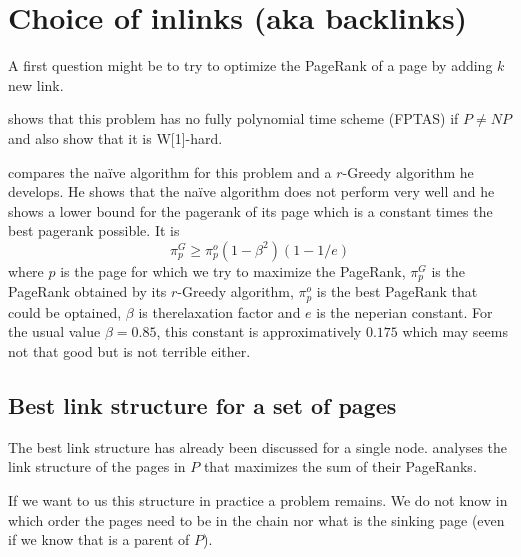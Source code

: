 \documentclass{article}
\newcommand{\1}{\mathbf{1}}
\theoremstyle{definition}
\begin{document}
\section{Choice of inlinks (aka backlinks)}
A first question might be to try to optimize the PageRank of a page
by adding $k$ new link.

\cite{olsen2010maximizing} shows that this problem has no fully polynomial time scheme (FPTAS) if $P \neq NP$ and also show that it is W[1]-hard.

\cite{olsen2010constant} compares the naïve algorithm for this problem and a $r$-Greedy algorithm he develops.
He shows that the naïve algorithm does not perform very well and he shows a lower bound for the pagerank of its page which is a constant times the best pagerank possible. It is
\[ \pi_p^G \geq \pi_p^o(1 - \beta^2)(1 - 1/e) \]
where $p$ is the page for which we try to maximize the PageRank,
$\pi_p^G$ is the PageRank obtained by its $r$-Greedy algorithm, $\pi_p^o$ is the best PageRank that could be optained, $\beta$ is therelaxation factor and $e$ is the neperian constant.
For the usual value $\beta = 0.85$, this constant is approximatively $0.175$ which may seems not that good but is not terrible either.

\subsection{Best link structure for a set of pages}
The best link structure has already been discussed for a single node.
\cite{de2008maximizing} analyses the link structure of the pages in $P$ that maximizes the sum of their PageRanks.

If we want to us this structure in practice a problem remains.
We do not know in which order the pages need to be in the chain
nor what is the sinking page (even if we know that is a parent of $P$).
\end{document}
